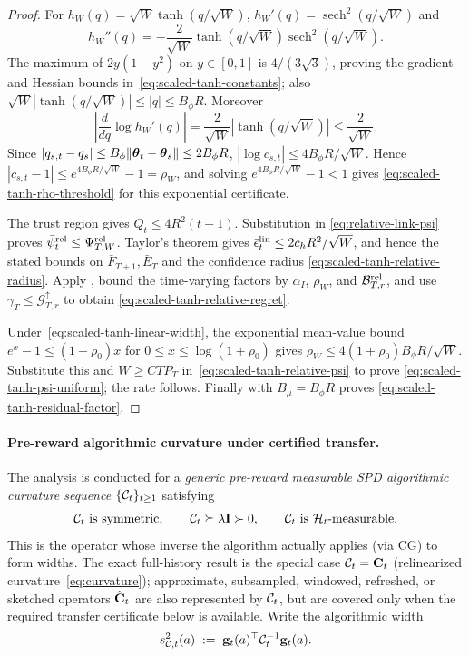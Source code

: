 \begin{proof}
For $h_W(q)=\sqrt W\tanh(q/\sqrt W)$,
$h_W'(q)=\operatorname{sech}^2(q/\sqrt W)$ and
\[
 h_W''(q)=-\frac{2}{\sqrt W}\tanh(q/\sqrt W)
 \operatorname{sech}^2(q/\sqrt W).
\]
The maximum of $2y(1-y^2)$ on $y\in[0,1]$ is $4/(3\sqrt3)$, proving the
gradient and Hessian bounds in~\eqref{eq:scaled-tanh-constants}; also
$\sqrt W|\tanh(q/\sqrt W)|\le|q|\le B_\phi R$.
Moreover
\[
 \left|\frac{d}{dq}\log h_W'(q)\right|
 =\frac{2}{\sqrt W}|\tanh(q/\sqrt W)|\le\frac2{\sqrt W}.
\]
Since $|q_{s,t}-q_s|\le B_\phi\|\boldsymbol{\theta}_t-\boldsymbol{\theta}_s\|\le2B_\phi R$,
$|\log c_{s,t}|\le4B_\phi R/\sqrt W$.  Hence
$|c_{s,t}-1|\le e^{4B_\phi R/\sqrt W}-1=\rho_W$, and solving
$e^{4B_\phi R/\sqrt W}-1<1$ gives
\eqref{eq:scaled-tanh-rho-threshold} for this exponential certificate.

The trust region gives $Q_t\le4R^2(t-1)$.  Substitution in
\eqref{eq:relative-link-psi} proves
$\bar\psi_t^{\rm rel}\le\Psi^{\rm rel}_{T,W}$.  Taylor's theorem gives
$\bar\epsilon_t^{\rm lin}\le2c_hR^2/\sqrt W$, and hence the stated bounds on
$\bar F_{T+1},\bar E_T$ and the confidence radius
\eqref{eq:scaled-tanh-relative-radius}.  Apply
, bound the time-varying factors by
$\alpha_I$, $\rho_W$, and $\mathcal B^{\rm rel}_{T,r}$, and use
$\gamma_T\le\mathcal G^\uparrow_{T,r}$ to obtain
\eqref{eq:scaled-tanh-relative-regret}.

Under~\eqref{eq:scaled-tanh-linear-width}, the exponential mean-value bound
$e^x-1\le(1+\rho_0)x$ for $0\le x\le\log(1+\rho_0)$ gives
$\rho_W\le4(1+\rho_0)B_\phi R/\sqrt W$.  Substitute this and
$W\ge CTP_T$ in~\eqref{eq:scaled-tanh-relative-psi} to prove
\eqref{eq:scaled-tanh-psi-uniform}; the rate follows.  Finally
 with $B_\mu=B_\phi R$ proves
\eqref{eq:scaled-tanh-residual-factor}.
\end{proof}

\paragraph{Pre-reward algorithmic curvature under certified transfer.}
The analysis is conducted for a \emph{generic pre-reward measurable SPD algorithmic
curvature sequence} $\{\mathcal{C}_t\}_{t\ge1}$ satisfying
\begin{equation}\label{eq:calg-props}
  \mathcal{C}_t\ \text{is symmetric},\qquad
  \mathcal{C}_t\succeq\lambda\mathbf{I}\succ 0,\qquad
  \mathcal{C}_t\ \text{is}\ \mathcal{H}_t\text{-measurable}.
\end{equation}
This is the operator whose inverse the algorithm actually applies (via CG)
to form widths.  The exact full-history result is the special case
$\mathcal{C}_t=\mathbf{C}_t$ (relinearized curvature~\eqref{eq:curvature}); approximate,
subsampled, windowed, refreshed, or sketched operators $\hat{\mathbf{C}}_t$ are also
represented by $\mathcal{C}_t$, but are covered only when the required transfer
certificate below is available.  Write the algorithmic width
\begin{equation}\label{eq:scalg-def}
  s_{\mathcal{C},t}^2(a)\;:=\;\mathbf{g}_t(a)^\top\mathcal{C}_t^{-1}\mathbf{g}_t(a).
\end{equation}

